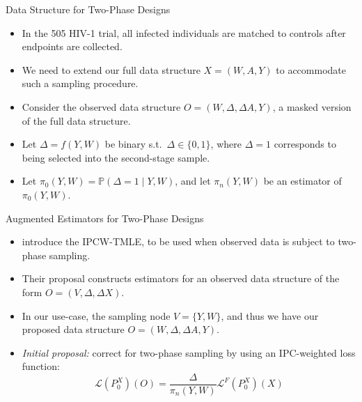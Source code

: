 \documentclass{beamer}
\newcommand{\pr}{\mathbb{P}}
\newcommand{\lik}{\mathcal{L}}
\begin{document}
\begin{frame}[c]{Data Structure for Two-Phase Designs}

\begin{center}
\begin{itemize}
  \itemsep8pt
  \item In the 505 HIV-1 trial, all infected individuals are matched to controls
    after endpoints are collected.
  \item We need to extend our full data structure $X = (W,A,Y)$ to accommodate
    such a sampling procedure.
  \item Consider the observed data structure $O = (W, \Delta, \Delta A, Y)$, a
    masked version of the full data structure.
  \item Let $\Delta = f(Y, W)$ be binary s.t.~$\Delta \in \{0, 1\}$, where
    $\Delta = 1$ corresponds to being selected into the second-stage sample.
  \item Let $\pi_0(Y,W) = \pr(\Delta = 1 \mid Y,W)$, and let $\pi_n(Y,W)$ be an
    estimator of $\pi_0(Y,W)$.
\end{itemize}
\end{center}


\end{frame}


\begin{frame}[c]{Augmented Estimators for Two-Phase Designs}

\begin{center}
\begin{itemize}
  \itemsep10pt
  \item \cite{rose2011targeted2sd} introduce the IPCW-TMLE, to be used when
    observed data is subject to two-phase sampling.
  \item Their proposal constructs estimators for an observed data structure of
    the form $O = (V, \Delta, \Delta X)$.
  \item In our use-case, the sampling node $V = \{Y, W\}$, and thus we have our
    proposed data structure $O = (W, \Delta, \Delta A, Y)$.
  \item \textit{Initial proposal:} correct for two-phase sampling by using an
    IPC-weighted loss function:
    \begin{equation*}
      \lik(P_0^X)(O) = \frac{\Delta}{\pi_n(Y, W)}\lik^F(P_0^X)(X)
    \end{equation*}
\end{itemize}
\end{center}

\note{
}

\end{frame}
\end{document}
